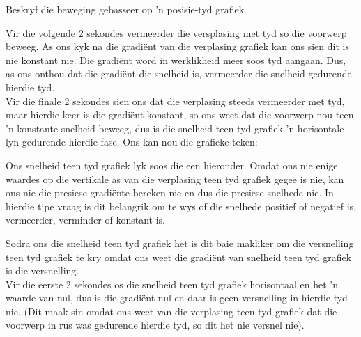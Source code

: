 \begin{wex}{Beskryf die beweging gebasseer op  'n posisie-tyd grafiek.}
{
Vir die volgende 2 sekondes vermeerder die versplasing met tyd so die voorwerp beweeg. As ons kyk na die gradi\"ent van die verplasing grafiek kan ons sien dit is nie konstant nie. Die gradi\"ent word in werklikheid meer soos tyd aangaan. Dus, as ons onthou dat die gradi\"ent die snelheid is, vermeerder die snelheid gedurende hierdie tyd. \\

Vir die finale 2 sekondes sien ons dat die verplasing steeds vermeerder met tyd, maar hierdie keer is die gradi\"ent konstant, so ons weet dat die voorwerp nou teen  'n konstante snelheid beweeg, dus is die snelheid teen tyd grafiek  'n horisontale lyn gedurende hierdie fase. Ons kan nou die grafieke teken:

Ons snelheid teen tyd grafiek lyk soos die een hieronder. Omdat ons nie enige waardes op die vertikale as van die verplasing teen tyd grafiek gegee is nie, kan ons nie die presiese gradi\"ente bereken nie en dus die presiese snelhede nie. In hierdie tipe vraag is dit belangrik om te wys of die snelhede positief of negatief is, vermeerder, verminder of konstant is.

\begin{center}
\end{center}

Sodra ons die snelheid teen tyd grafiek het is dit baie makliker om die versnelling teen tyd grafiek te kry omdat ons weet die gradi\"ent van snelheid teen tyd grafiek is die versnelling.\\

Vir die eerste 2 sekondes os die snelheid teen tyd grafiek horisontaal en het  'n waarde van nul, dus is die gradi\"ent nul en daar is geen versnelling in hierdie tyd nie. (Dit maak sin omdat ons weet van die verplasing teen tyd grafiek dat die voorwerp in rus was gedurende hierdie tyd, so dit het nie versnel nie).\\ 

}
\end{wex}
